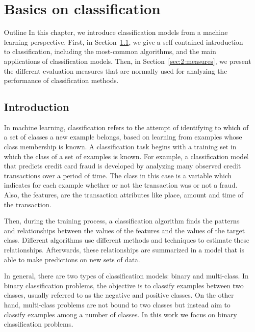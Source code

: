 \chapter{Basics on classification}\label{ch:2}

\begin{remark}{Outline}
In this chapter, we introduce classification models from a machine learning perspective. 
First, in Section~\ref{sec:2:classification}, we give a self contained introduction to 
classification, including the most-common algorithms, and the main applications of 
classification models. Then, in Section~\ref{sec:2:measures}, we present the different evaluation 
measures that are normally used for analyzing the performance of classification methods.
\end{remark}

\section{Introduction}
\label{sec:2:classification}

In machine learning, classification refers to the attempt of identifying to which of a set of 
classes a new example belongs, based on learning from examples whose class membership is known. 
A classification task begins with a training set in which the class of a set of examples is known. 
For example, a classification model that predicts credit card fraud is developed by analyzing 
many observed credit transactions over a period of time. The class in this case is a variable which 
indicates for each example whether or not the transaction was or not a fraud. Also, the features, 
are the transaction attributes like place, amount and time of the transaction.

Then, during the training process, a classification algorithm finds the patterns and relationships 
between the values of the features and the values of the target class. Different algorithms use 
different methods and techniques to estimate these relationships. Afterwards, these relationships 
are summarized in a model that is able to make predictions on new sets of data.

In general, there are two types of classification models: binary and multi-class. In binary 
classification problems, the objective is to classify examples between two classes, usually 
referred to as the negative and positive classes. On the other hand, multi-class problems are not 
bound to two classes but instead aim to classify examples among a number of classes. In this work we 
focus on binary classification problems.

